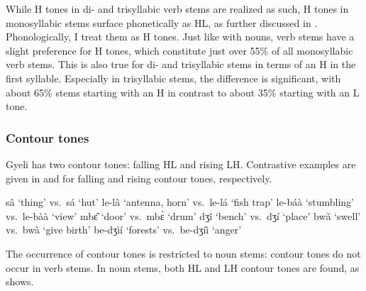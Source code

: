 While H tones in di- and trisyllabic verb stems are realized as such, H tones in monosyllabic stems surface phonetically as HL, as further discussed in . Phonologically, I treat them as H tones. Just like with nouns, verb stems have a slight preference for H tones, which constitute just over 55\% of all monosyllabic verb stems. This is also true for di- and trisyllabic stems in terms of an H in the first syllable. Especially in trisyllabic stems, the difference is significant, with about 65\% stems starting with an H in contrast to about 35\% starting with an L tone. 


\subsubsection{Contour tones}
\label{sec:Contour}
\largerpage

Gyeli has two contour tones: falling HL and rising LH. Contrastive examples are given in  and  for falling and rising contour tones, respectively.


\ea \label{contourHL}
  \ea  sâ `thing' vs.\ sá `hut'
\ex  le-lâ `antenna, horn' vs.\ le-lá `fish trap' 
\ex le-báà `stumbling' vs.\ le-bàà `view'
\ex  mbɛ̂ `door' vs.\ mbɛ̀ `drum'
\z
\ex \label{contourLH}
  \ea   dʒǐ `bench' vs.\ dʒí `place'
\ex bwǎ `swell' vs.\ bwà `give birth'
\ex be-dʒìí `forests' vs.\ be-dʒíì `anger'
\z
\z


The occurrence of contour tones is restricted to noun stems: contour tones do not occur in verb stems. In noun stems, both HL and LH contour tones are found, as  shows.


